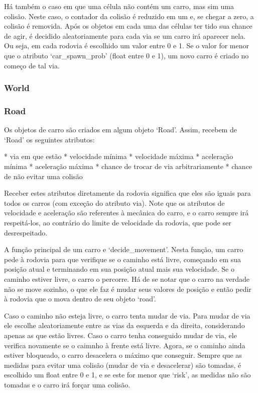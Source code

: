 \documentclass{article}
\begin{document}
    Há também o caso em que uma célula não contém um carro, mas sim uma colisão. Neste caso, o contador da colisão
    é reduzido em um e, se chegar a zero, a colisão é removida.
    Após os objetos em cada uma das células ter tido sua chance de agir, é decidido aleatoriamente para cada via se
    um carro irá aparecer nela. Ou seja, em cada rodovia é escolhido um valor entre 0 e 1. Se o valor for menor
    que o atributo `car\_spawn\_prob' (float entre 0 e 1), um novo carro é criado no começo de tal via.
    

    \subsubsection{World}

    \subsubsection{Road}
    Os objetos de carro são criados em algum objeto `Road'. Assim, recebem de `Road' os seguintes atributos:

    * via em que estão
    * velocidade mínima
    * velocidade máxima
    * aceleração mínima
    * aceleração máxima
    * chance de trocar de via arbitrariamente
    * chance de não evitar uma colisão

    Receber estes atributos diretamente da rodovia significa que eles são iguais para todos os carros (com
    exceção do atributo via). Note que os atributos de velocidade e aceleração são referentes à mecânica do
    carro, e o carro sempre irá respeitá-los, ao contrário do limite de velocidade da rodovia, que pode ser
    desrespeitado.

    A função principal de um carro e `decide\_movement'. Nesta função, um carro pede à rodovia para que verifique
    se o caminho está livre, começando em sua posição atual e terminando em sua posição atual mais sua velocidade.
    Se o caminho estiver livre, o carro o percorre. Há de se notar que o carro na verdade não se move sozinho, o que
    ele faz é mudar seus valores de posição e então pedir à rodovia que o mova dentro de seu objeto `road'.

    Caso o caminho não esteja livre, o carro tenta mudar de via. Para mudar de via ele escolhe aleatoriamente entre
    as vias da esquerda e da direita, considerando apenas as que estão livres. Caso o carro tenha conseguido mudar
    de via, ele verifica novamente se o caimnho à frente está livre. Agora, se o caminho ainda estiver bloqueado, o
    carro desacelera o máximo que conseguir. Sempre que as medidas para evitar uma colisão (mudar de via e desacelerar)
    são tomadas, é escolhido um float entre 0 e 1, e se este for menor que `risk', as medidas não são tomadas e o
    carro irá forçar uma colisão.
\end{document}
